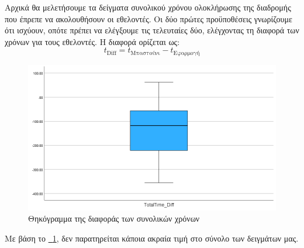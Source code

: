 Αρχικά θα μελετήσουμε τα δείγματα συνολικού χρόνου ολοκλήρωσης της διαδρομής που έπρεπε να ακολουθήσουν οι εθελοντές. Οι δύο πρώτες προϋποθέσεις γνωρίζουμε ότι ισχύουν, οπότε πρέπει να ελέγξουμε τις τελευταίες δύο, ελέγχοντας τη διαφορά των χρόνων για τους εθελοντές. Η διαφορά ορίζεται ως:
\[
    t_{\text{Diff}} = t_{\text{Μπαστούνι}} - t_{\text{Εφαρμογή}}
\]

\begin{figure}[!h]
    \centering
    \includegraphics[width=0.8\linewidth]{./images/SA_Boxplot_TotalTimeDiff.png}
    \caption{Θηκόγραμμα της διαφοράς των συνολικών χρόνων}\label{fig:SABoxplotTTDiff}
\end{figure}

Με βάση το \hyperref[fig:SABoxplotTTDiff]{\schema~\ref*{fig:SABoxplotTTDiff}}, δεν παρατηρείται κάποια ακραία τιμή στο σύνολο των δειγμάτων μας.

